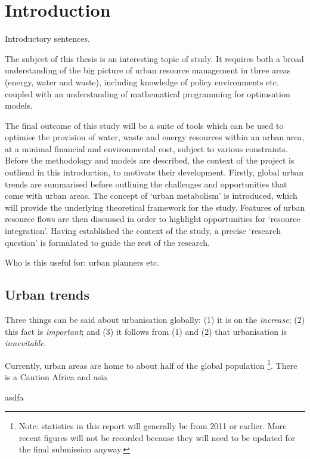 \section{Introduction}
Introductory sentences.

The subject of this thesis is an interesting topic of study. It requires both a broad understanding of the big picture of urban resource management in three areas (energy, water and waste), including knowledge of policy environments etc. coupled with an understanding of mathematical programming for optimsation models.

The final outcome of this study will be a suite of tools which can be used to optimise the provision of water, waste and energy resources within an urban area, at a minimal financial and environmental cost, subject to various constraints. Before the methodology and models are described, the context of the project is outliend in this introduction, to motivate their development. Firstly, global urban trends are summarised before outlining the challenges and opportunities that come with urban areas. The concept of `urban metabolism' is introduced, which will provide the underlying theoretical framework for the study. Features of urban resource flows are then discussed in order to highlight opportunities for `resource integration'. Having established the context of the study, a precise `research question' is formulated to guide the rest of the research.

Who is this useful for: urban planners etc.

\subsection{Urban trends}
Three things can be said about urbanisation globally: (1) it is on the \emph{increase}; (2) this fact is \emph{important}; and (3) it follows from (1) and (2) that urbanisation is \emph{innevitable}.

Currently, urban areas are home to about half of the global population \citep{AREAS2012}\footnote{Note: statistics in this report will generally be from 2011 or earlier. More recent figures will not be recorded because they will need to be updated for the final submission anyway.}. There is a 
\citet{Cohen2006}
\citet{DepartmentforCommunitiesandLocalGovernment2006}
\citet{Audelo-Vera2011}
\citet{Cohen2004} Caution
\citet{York2011} Africa and asia

asdfa



